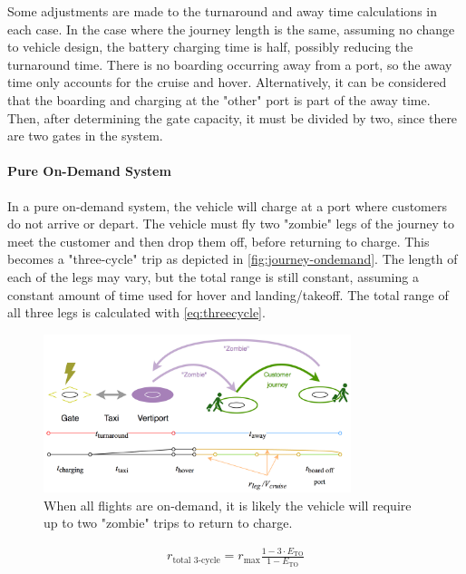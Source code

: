 Some adjustments are made to the turnaround and away time calculations in each case. In the case where the journey length is the same, assuming no change to vehicle design, the battery charging time is half, possibly reducing the turnaround time. There is no boarding occurring away from a port, so the away time only accounts for the cruise and hover. Alternatively, it can be considered that the boarding and charging at the "other" port is part of the away time. Then, after determining the gate capacity, it must be divided by two, since there are two gates in the system.

\paragraph{Pure On-Demand System}
In a pure on-demand system, the vehicle will charge at a port where customers do not arrive or depart. The vehicle must fly two "zombie" legs of the journey to meet the customer and then drop them off, before returning to charge. This becomes a "three-cycle" trip as depicted in \autoref{fig:journey-ondemand}. The length of each of the legs may vary, but the total range is still constant, assuming a constant amount of time used for hover and landing/takeoff. The total range of all three legs is calculated with \autoref{eq:threecycle}.

\begin{figure}[H]
    \centering
    \includegraphics[width=0.8\textwidth]{Figures/journey-ondemand.png}
    \captionsetup{justification=centering}
    \caption{When all flights are on-demand, it is likely the vehicle will require up to two "zombie" trips to return to charge.}
    \label{fig:journey-ondemand}
\end{figure}

\begin{equation}[H]
\label{eq:threecycle}
\begin{split}
    r_\text{total 3-cycle} = r_\text{max}\frac{1-3\cdot E_\text{TO}}{1 - E_\text{TO}}
\end{split}
\end{equation}

